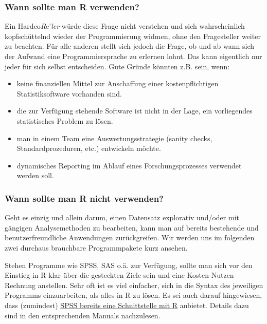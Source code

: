 \documentclass[]{article}
\providecommand{\tightlist}{%
  \setlength{\itemsep}{0pt}\setlength{\parskip}{0pt}}
\begin{document}
\subsubsection*{\texorpdfstring{\textbf{Wann} sollte man \textbf{R}
verwenden?}{Wann sollte man R verwenden?}}\label{wann-sollte-man-r-verwenden}

Ein Hardco\emph{R}e'\emph{ler} würde diese Frage nicht verstehen und
sich wahrscheinlich kopfschüttelnd wieder der Programmierung widmen,
ohne den Fragesteller weiter zu beachten. Für alle anderen stellt sich
jedoch die Frage, ob und ab wann sich der Aufwand eine
Programmiersprache zu erlernen lohnt. Das kann eigentlich nur jeder für
sich selbst entscheiden. Gute Gründe könnten z.B. sein, wenn:

\begin{itemize}
\tightlist
\item
  keine finanziellen Mittel zur Anschaffung einer kostenpflichtigen
  Statistiksoftware vorhanden sind.
\item
  die zur Verfügung stehende Software ist nicht in der Lage, ein
  vorliegendes statistisches Problem zu lösen.
\item
  man in einem Team eine Auswertungsstrategie (sanity checks,
  Standardprozeduren, etc.) entwickeln möchte.
\item
  dynamisches Reporting im Ablauf eines Forschungsprozesses verwendet
  werden soll.
\end{itemize}

\subsubsection*{\texorpdfstring{\textbf{Wann} sollte man \textbf{R
nicht}
verwenden?}{Wann sollte man R nicht verwenden?}}\label{wann-sollte-man-r-nicht-verwenden}

Geht es einzig und allein darum, einen Datensatz explorativ und/oder mit
gängigen Analysemethoden zu bearbeiten, kann man auf bereits bestehende
und benutzerfreundliche Anwendungen zurückgreifen. Wir werden uns im
folgenden zwei durchaus brauchbare Programmpakete kurz ansehen.

Stehen Programme wie SPSS, SAS o.ä. zur Verfügung, sollte man sich vor
den Einstieg in R klar über die gesteckten Ziele sein und eine
Kosten-Nutzen-Rechnung anstellen. Sehr oft ist es viel einfacher, sich
in die Syntax des jeweiligen Programms einzuarbeiten, als alles in R zu
lösen. Es sei auch darauf hingewiesen, dass (zumindest)
\href{https://www.ibm.com/support/knowledgecenter/de/SSLVMB_25.0.0/statistics_r_tutorial_project_ddita/spss/tutorials/rtut_intro.html}{SPSS
bereits eine Schnittstelle mit R} anbietet. Details dazu sind in den
entsprechenden Manuals nachzulesen.
\end{document}
